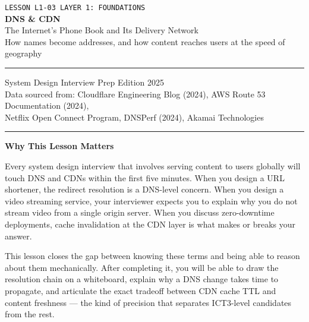 \documentclass[11pt,a4paper]{article}
\begin{document}
\begin{titlepage}
  \vspace*{3cm}
  \begin{center}
    {\footnotesize\color{primary!60}\texttt{LESSON L1-03 \quad\textbullet\quad LAYER 1: FOUNDATIONS}}\\[0.8cm]
    {\Huge\bfseries\color{primary} DNS \& CDN}\\[0.5cm]
    {\Large\color{primary!70} The Internet's Phone Book and Its Delivery Network}\\[0.4cm]
    {\normalsize\color{primary!50} How names become addresses, and how content reaches users at the speed of geography}\\[2.5cm]
    {\color{highlight!60}\rule{\linewidth}{0.4pt}}
    \vspace{0.4cm}
    {\small\color{primary!60}
      System Design Interview Prep \quad\textbullet\quad Edition 2025\\[0.2cm]
      Data sourced from: Cloudflare Engineering Blog (2024), AWS Route 53 Documentation (2024),\\
      Netflix Open Connect Program, DNSPerf (2024), Akamai Technologies
    }
    \vspace{0.8cm}
    {\color{highlight!60}\rule{\linewidth}{0.4pt}}
  \end{center}

  \vspace{1.5cm}
  \begin{insightbox}
    \textbf{Why This Lesson Matters}

    Every system design interview that involves serving content to users globally will touch DNS and CDNs within the first five minutes. When you design a URL shortener, the redirect resolution is a DNS-level concern. When you design a video streaming service, your interviewer expects you to explain why you do not stream video from a single origin server. When you discuss zero-downtime deployments, cache invalidation at the CDN layer is what makes or breaks your answer.

    This lesson closes the gap between knowing these terms and being able to reason about them mechanically. After completing it, you will be able to draw the resolution chain on a whiteboard, explain why a DNS change takes time to propagate, and articulate the exact tradeoff between CDN cache TTL and content freshness --- the kind of precision that separates ICT3-level candidates from the rest.
  \end{insightbox}
\end{titlepage}
\nopagecolor
\end{document}
